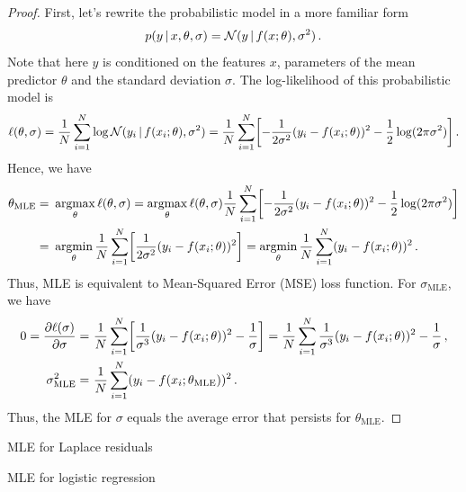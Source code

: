 \begin{proof}
    First, let's rewrite the probabilistic model in a more familiar form
    \begin{align}
        p(y\,|\, x,\theta,\sigma) = \mathcal{N}(y\,|\, f(x;\theta), \sigma^2)\,.
    \end{align}
    Note that here $y$ is conditioned on the features $x$, parameters of the mean predictor $\theta$ and the standard deviation $\sigma$.
    The log-likelihood of this probabilistic model is
    \begin{align}
        \ell(\theta,\sigma) = \frac{1}{N}\sum_{i=1}^N \log \Normal(y_i\cond f(x_i;\theta), \sigma^2) = \frac{1}{N}\sum_{i=1}^N \left[-\frac{1}{2\sigma^2}(y_i-f(x_i;\theta))^2 - \frac{1}{2}\log (2\pi\sigma^2)\right]\,.
    \end{align}
    Hence, we have
    \begin{align}
        \theta_{\text{MLE}} =~& \argmax_\theta \ell(\theta,\sigma) = \argmax_\theta \ell(\theta,\sigma) \frac{1}{N}\sum_{i=1}^N \left[-\frac{1}{2\sigma^2}(y_i-f(x_i;\theta))^2 - \frac{1}{2}\log (2\pi\sigma^2)\right]\\
        =~& \argmin_\theta \frac{1}{N}\sum_{i=1}^N \left[\frac{1}{2\sigma^2}(y_i-f(x_i;\theta))^2\right] = \argmin_\theta \frac{1}{N}\sum_{i=1}^N (y_i-f(x_i;\theta))^2\,.
    \end{align}
    Thus, MLE is equivalent to Mean-Squared Error (MSE) loss function.
    For $\sigma_{\text{MLE}}$, we have
    \begin{align}
        0 = \deriv{\ell(\sigma)}{\sigma} =~& \frac{1}{N}\sum_{i=1}^N \left[\frac{1}{\sigma^3}(y_i-f(x_i;\theta))^2 - \frac{1}{\sigma}\right] = \frac{1}{N}\sum_{i=1}^N \frac{1}{\sigma^3}(y_i-f(x_i;\theta))^2 - \frac{1}{\sigma}\,,\\
        \sigma_{\text{MLE}}^2 = ~& \frac{1}{N}\sum_{i=1}^N (y_i-f(x_i;\theta_\text{MLE}))^2\,.
    \end{align}
    Thus, the MLE for $\sigma$ equals the average error that persists for $\theta_{\text{MLE}}$.
\end{proof}

\begin{exercise}
    MLE for Laplace residuals
\end{exercise}

\begin{exercise}
    MLE for logistic regression
\end{exercise}

